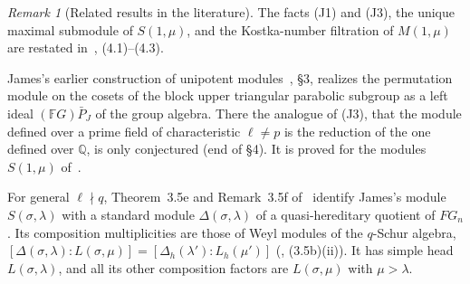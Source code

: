 \documentclass[11pt, letterpaper]{amsart}
\theoremstyle{definition}
\theoremstyle{remark}
\newtheorem{remark}{Remark}
\newcommand{\FF}{\mathbb{F}}
\begin{document}
\begin{remark}[Related results in the literature]
The facts (J1) and (J3), the unique maximal submodule of $S(1,\mu)$, and the Kostka-number filtration of $M(1,\mu)$ are restated in~\cite{DJid}, (4.1)--(4.3).

James's earlier construction of unipotent modules~\cite{James82}, \S3, realizes the permutation module on the cosets of the block upper triangular parabolic subgroup as a left ideal $(\FF G)\bar P_J$ of the group algebra. There the analogue of (J3), that the module defined over a prime field of characteristic $\ell\ne p$ is the reduction of the one defined over $\mathbb Q$, is only conjectured (end of \S4). It is proved for the modules $S(1,\mu)$ of~\cite{Jam86}.

For general $\ell\nmid q$, Theorem~3.5e and Remark~3.5f of~\cite{BDK} identify James's module $S(\sigma,\lambda)$ with a standard module $\Delta(\sigma,\lambda)$ of a quasi-hereditary quotient of $FG_n$. Its composition multiplicities are those of Weyl modules of the $q$-Schur algebra, $[\Delta(\sigma,\lambda):L(\sigma,\mu)]=[\Delta_h(\lambda'):L_h(\mu')]$ (\cite{BDK}, (3.5b)(ii)). It has simple head $L(\sigma,\lambda)$, and all its other composition factors are $L(\sigma,\mu)$ with $\mu>\lambda$.
\end{remark}
\end{document}
